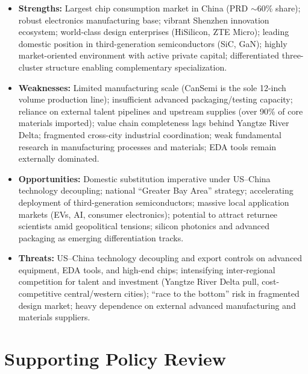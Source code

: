 \documentclass[12pt,a4paper]{article}
\begin{document}
\begin{itemize}
    \item \textbf{Strengths:} Largest chip consumption market in China
          (PRD $\sim$60\% share); robust electronics manufacturing base;
          vibrant Shenzhen innovation ecosystem; world-class design
          enterprises (HiSilicon, ZTE Micro); leading domestic position
          in third-generation semiconductors (SiC, GaN); highly
          market-oriented environment with active private capital;
          differentiated three-cluster structure enabling complementary
          specialization.
    \item \textbf{Weaknesses:} Limited manufacturing scale (CanSemi is
          the sole 12-inch volume production line); insufficient advanced
          packaging/testing capacity; reliance on external talent
          pipelines and upstream supplies (over 90\% of core materials
          imported); value chain completeness lags behind Yangtze River
          Delta; fragmented cross-city industrial coordination; weak
          fundamental research in manufacturing processes and materials;
          EDA tools remain externally dominated.
    \item \textbf{Opportunities:} Domestic substitution imperative under
          US--China technology decoupling; national ``Greater Bay Area''
          strategy; accelerating deployment of third-generation
          semiconductors; massive local application markets (EVs, AI,
          consumer electronics); potential to attract returnee scientists
          amid geopolitical tensions; silicon photonics and advanced
          packaging as emerging differentiation tracks.
    \item \textbf{Threats:} US--China technology decoupling and export
          controls on advanced equipment, EDA tools, and high-end chips;
          intensifying inter-regional competition for talent and
          investment (Yangtze River Delta pull, cost-competitive
          central/western cities); ``race to the bottom'' risk in
          fragmented design market; heavy dependence on external
          advanced manufacturing and materials suppliers.
\end{itemize}

\section{Supporting Policy Review}
\label{sec:policy}
\end{document}
